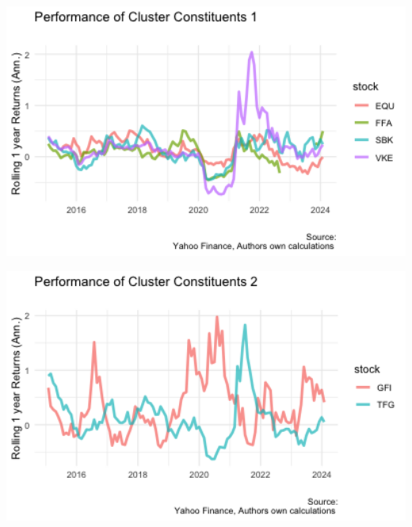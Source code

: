 \documentclass[11pt,preprint, authoryear]{elsarticle}
\let\origfigure\figure
\let\endorigfigure\endfigure
\renewenvironment{figure}[1][2] {
    \expandafter\origfigure\expandafter[H]
} {
    \endorigfigure
}
\numberwithin{equation}{section}
\numberwithin{figure}{section}
\numberwithin{table}{section}
\begin{document}
\begin{figure}[H]

\includegraphics[width=5.56in]{images/returnplots_1} \hfill{}

\caption{ Clusters Results from Highest Silhoutte \label{fig2}}\label{fig:unnamed-chunk-5-1}
\end{figure}
\begin{figure}[H]

\includegraphics[width=5.56in]{images/returnplots_2} \hfill{}

\caption{ Clusters Results from Highest Silhoutte \label{fig2}}\label{fig:unnamed-chunk-5-2}
\end{figure}
\end{document}
